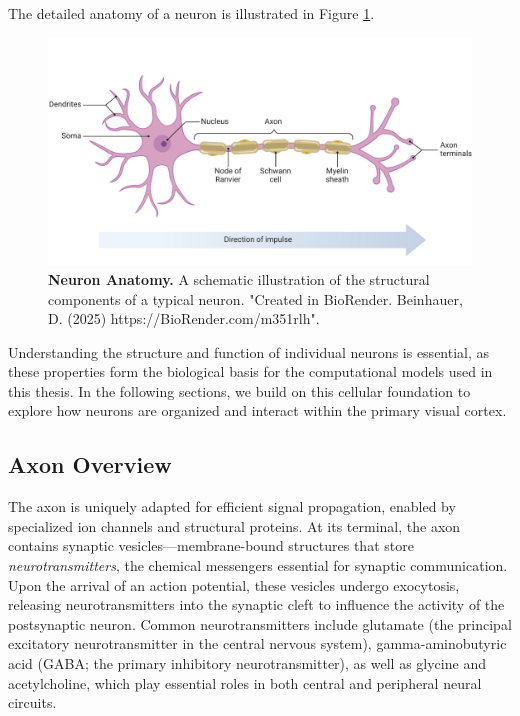 The detailed anatomy of a neuron is illustrated in Figure \ref{fig:neuron}.

\begin{figure}
    \centering
    \includegraphics[width=\linewidth]{img/neuron_anatomy.pdf}
    \caption{\textbf{Neuron Anatomy.} A schematic illustration of the structural components of a typical neuron. "Created in BioRender. Beinhauer, D. (2025) https://BioRender.com/m351rlh".}
    \label{fig:neuron}
\end{figure}

Understanding the structure and function of individual neurons is essential, as these properties form the biological basis for the computational models used in this thesis. In the following sections, we build on this cellular foundation to explore how neurons are organized and interact within the primary visual cortex.

\subsection{Axon Overview}
\label{subsec:axon}

The axon is uniquely adapted for efficient signal propagation, enabled by specialized ion channels and structural proteins. At its terminal, the axon contains synaptic vesicles—membrane-bound structures that store \emph{neurotransmitters}, the chemical messengers essential for synaptic communication. Upon the arrival of an action potential, these vesicles undergo exocytosis, releasing neurotransmitters into the synaptic cleft to influence the activity of the postsynaptic neuron. Common neurotransmitters include glutamate (the principal excitatory neurotransmitter in the central nervous system), gamma-aminobutyric acid (GABA; the primary inhibitory neurotransmitter), as well as glycine and acetylcholine, which play essential roles in both central and peripheral neural circuits.

